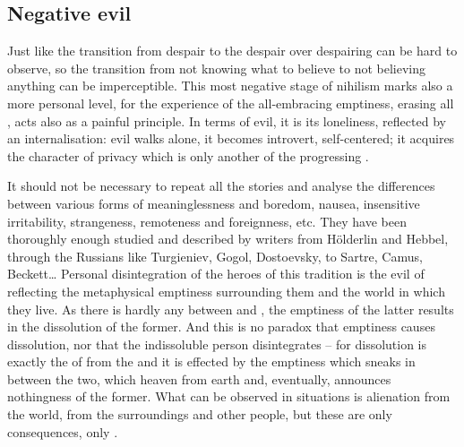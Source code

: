 \subsection{Negative evil}\label{sub:negativum}
\pa Just like the transition from despair to the despair over despairing can be
hard to observe, so the transition from not knowing what to believe to not
believing anything can be imperceptible.  This most negative stage of nihilism
marks also a more personal level, for the experience of the all-embracing
emptiness, erasing all , acts also as a painful
 principle.  In terms of evil, it is its loneliness,
reflected by an internalisation: evil walks alone, it becomes introvert,
self-centered; it acquires the character of privacy which is only another
 of the progressing .

It should not be necessary to repeat all the stories and analyse the
differences between various forms of meaninglessness and boredom, nausea,
insensitive irritability, strangeness, remoteness and foreignness, etc. They have
been thoroughly enough studied and described by writers from H\"{o}lderlin and
Hebbel, through the  Russians like Turgieniev, Gogol, Dostoevsky, to
Sartre, Camus, Beckett\ldots
Personal disintegration of the heroes of this tradition is the evil of
 reflecting the metaphysical emptiness surrounding them and the
world in which they live. As there is hardly any  between
 and , the  emptiness of the latter results in
the dissolution of the former. And this is no paradox that emptiness causes
dissolution, nor that the indissoluble person disintegrates -- for dissolution
is exactly the  of  from the  and it is
effected by the emptiness which sneaks in between the two, which
 heaven from earth and, eventually, announces nothingness of the former. 
What can be observed in  situations is alienation from
the world, from the surroundings and other people, but these are only 
consequences, only . 

